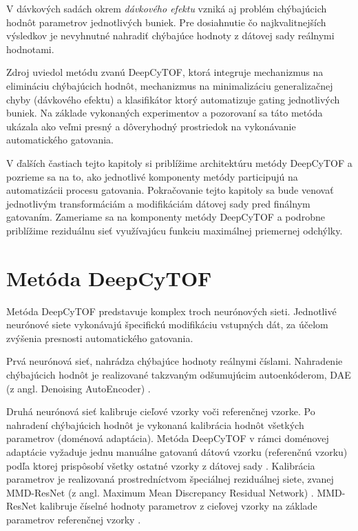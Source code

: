 V dávkových sadách okrem \textit{dávkového efektu} vzniká aj problém chýbajúcich hodnôt parametrov jednotlivých buniek. Pre dosiahnutie čo najkvalitnejších výsledkov je nevyhnutné nahradiť chýbajúce hodnoty z dátovej sady reálnymi hodnotami. 

Zdroj \cite{Li2017} uviedol metódu zvanú DeepCyTOF, ktorá integruje mechanizmus na elimináciu chýbajúcich hodnôt, mechanizmus na minimalizáciu generalizačnej chyby (dávkového efektu) a klasifikátor ktorý automatizuje gating jednotlivých buniek. Na základe vykonaných experimentov a pozorovaní sa táto metóda ukázala ako veľmi presný a dôveryhodný prostriedok na vykonávanie automatického gatovania.

V ďalších častiach tejto kapitoly si priblížime architektúru metódy DeepCyTOF a pozrieme sa na to, ako jednotlivé komponenty metódy participujú na automatizácii procesu gatovania. Pokračovanie tejto kapitoly sa bude venovať jednotlivým transformáciám a modifikáciám dátovej sady pred finálnym gatovaním. Zameriame sa na komponenty metódy DeepCyTOF a podrobne priblížime reziduálnu sieť využívajúcu funkciu maximálnej priemernej odchýlky.

\section{Metóda DeepCyTOF}

Metóda DeepCyTOF predstavuje komplex troch neurónových sieti. Jednotlivé neurónové siete vykonávajú špecifickú modifikáciu vstupných dát, za účelom zvýšenia presnosti automatického gatovania. 

Prvá neurónová sieť, nahrádza chýbajúce hodnoty reálnymi číslami. Nahradenie chýbajúcich hodnôt je realizované takzvaným odšumujúcim autoenkóderom, DAE (z angl. Denoising AutoEncoder) \cite{Li2017}. 

Druhá neurónová sieť kalibruje cieľové vzorky voči referenčnej vzorke. Po nahradení chýbajúcich hodnôt je vykonaná kalibrácia hodnôt všetkých parametrov (doménová adaptácia). Metóda DeepCyTOF v rámci doménovej adaptácie vyžaduje jednu manuálne gatovanú dátovú vzorku (referenčnú vzorku) podľa ktorej prispôsobí všetky ostatné vzorky z dátovej sady \cite{Li2017}. Kalibrácia parametrov je realizovaná prostredníctvom špeciálnej reziduálnej siete, zvanej MMD-ResNet (z angl. Maximum Mean Discrepancy Residual Network) \cite{Li2016, Li2017}. MMD-ResNet kalibruje číselné hodnoty parametrov z cieľovej vzorky na základe parametrov referenčnej vzorky \cite{Li2016}.

